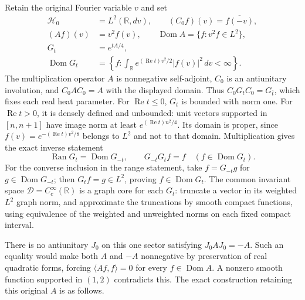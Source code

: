 Retain the original Fourier variable $v$ and set
\begin{equation}
\begin{split}
 \mathscr H_0&=L^2(\mathbb R,dv),\qquad
 (C_0f)(v)=\overline{f(-v)},\\
 (Af)(v)&=v^2f(v),\qquad
 \operatorname{Dom}A=\{f:v^2f\in L^2\},\\
 G_t&=e^{tA/4},\\
 \operatorname{Dom}G_t
 &=\left\{f:\int_{\mathbb R}
             e^{(\operatorname{Re}t)v^2/2}|f(v)|^2\,dv<\infty\right\}.
\end{split}
\label{eq:cq-Hilbert-heat-domain}
\end{equation}
The multiplication operator $A$ is nonnegative self-adjoint,
$C_0$ is an antiunitary involution, and $C_0AC_0=A$ with the
displayed domain. Thus
$C_0G_tC_0=G_{\overline t}$, which fixes each real heat parameter.
For $\operatorname{Re}t\leq0$, $G_t$ is bounded with norm one.
For $\operatorname{Re}t>0$, it is densely defined and unbounded:
unit vectors supported in $[n,n+1]$ have image norm at least
$e^{(\operatorname{Re}t)n^2/4}$. Its domain is proper, since
$f(v)=e^{-(\operatorname{Re}t)v^2/8}$ belongs to $L^2$ and not
to that domain. Multiplication gives the exact inverse statement
\begin{equation}
 \operatorname{Ran}G_t=\operatorname{Dom}G_{-t},\qquad
 G_{-t}G_t f=f\quad(f\in\operatorname{Dom}G_t).
 \label{eq:cq-heat-unbounded-inverse}
\end{equation}
For the converse inclusion in the range statement, take
$f=G_{-t}g$ for $g\in\operatorname{Dom}G_{-t}$; then
$G_tf=g\in L^2$, proving $f\in\operatorname{Dom}G_t$.
The common invariant space
$\mathscr D=C_c^\infty(\mathbb R)$ is a graph core for each
$G_t$: truncate a vector in its weighted $L^2$ graph norm,
and approximate the truncations by smooth compact functions,
using equivalence of the weighted and unweighted norms on
each fixed compact interval.

There is no antiunitary $J_0$ on this one sector satisfying
$J_0AJ_0=-A$. Such an equality would make both $A$ and $-A$
nonnegative by preservation of real quadratic forms, forcing
$\langle Af,f\rangle=0$ for every $f\in\operatorname{Dom}A$.
A nonzero smooth function supported in $(1,2)$ contradicts this.
The exact construction retaining this original $A$ is as follows.

